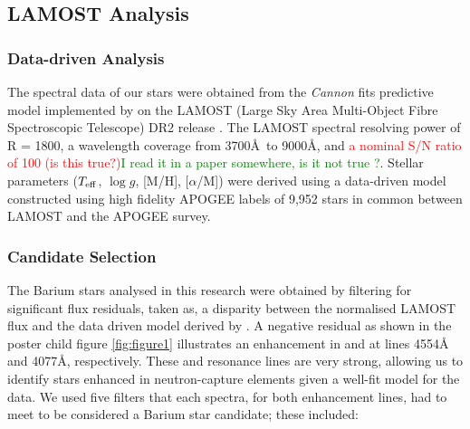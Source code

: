 \documentclass[a4paper,fleqn,usenatbib]{mnras}
\newcommand{\todo}[1]{\textcolor{red}{#1}}
\newcommand{\countertodo}[1]{\textcolor{green}{#1}}
\begin{document}
\subsection{LAMOST Analysis}
\subsubsection{Data-driven Analysis}
The spectral data of our stars were obtained from the \textit{Cannon} fits predictive model implemented by \citet{ho2017} on the LAMOST (Large Sky Area Multi-Object Fibre Spectroscopic Telescope) DR2 release \citep{luo2015}. The LAMOST spectral resolving power of R = 1800, a wavelength coverage from 3700\AA\ to 9000\AA, and \todo{a nominal S/N ratio of 100 (is this true?)}\countertodo{I read it in a paper somewhere, is it not true ?}. Stellar parameters ($T_{\rm eff}$, $\log{g}$, [M/H], [$\alpha$/M]) were derived using a data-driven model constructed using high fidelity APOGEE labels of 9,952 stars in common between LAMOST and the APOGEE survey.

\subsubsection{Candidate Selection} \label{sec:cand}
The Barium stars analysed in this research were obtained by filtering for significant flux residuals, taken as, a disparity between the normalised LAMOST flux and the data driven model derived by \citet{ho2017}. A negative residual as shown in the poster child figure \ref{fig:figure1} illustrates an enhancement in  and  at lines 4554\AA \hspace{0.2mm} and 4077\AA, respectively. These  and  resonance lines are very strong, allowing us to identify stars enhanced in neutron-capture elements given a well-fit model for the data. We used five filters that each spectra, for both enhancement lines, had to meet to be considered a Barium star candidate; these included:

\renewcommand\labelenumi{(\roman{enumi})}
\renewcommand\theenumi\labelenumi
\end{document}
